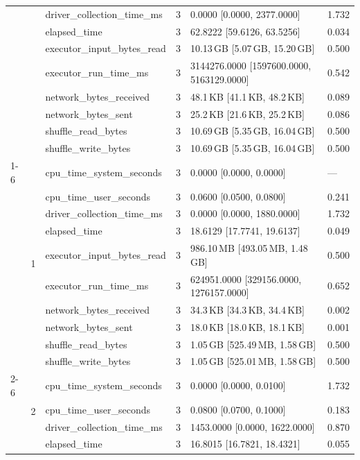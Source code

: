 \begin{tabular}{lllrll}
 &  & driver_collection_time_ms & 3 & 0.0000 [0.0000, 2377.0000] & 1.732 \\
 &  & elapsed_time & 3 & 62.8222 [59.6126, 63.5256] & 0.034 \\
 &  & executor_input_bytes_read & 3 & 10.13\,GB [5.07\,GB, 15.20\,GB] & 0.500 \\
 &  & executor_run_time_ms & 3 & 3144276.0000 [1597600.0000, 5163129.0000] & 0.542 \\
 &  & network_bytes_received & 3 & 48.1\,KB [41.1\,KB, 48.2\,KB] & 0.089 \\
 &  & network_bytes_sent & 3 & 25.2\,KB [21.6\,KB, 25.2\,KB] & 0.086 \\
 &  & shuffle_read_bytes & 3 & 10.69\,GB [5.35\,GB, 16.04\,GB] & 0.500 \\
 &  & shuffle_write_bytes & 3 & 10.69\,GB [5.35\,GB, 16.04\,GB] & 0.500 \\
\cline{1-6} \cline{2-6}
\multirow[t]{30}{*}{national-scale-spatial-join-databricks-broadcast-8-nodes-small} & \multirow[t]{10}{*}{1} & cpu_time_system_seconds & 3 & 0.0000 [0.0000, 0.0000] & --- \\
 &  & cpu_time_user_seconds & 3 & 0.0600 [0.0500, 0.0800] & 0.241 \\
 &  & driver_collection_time_ms & 3 & 0.0000 [0.0000, 1880.0000] & 1.732 \\
 &  & elapsed_time & 3 & 18.6129 [17.7741, 19.6137] & 0.049 \\
 &  & executor_input_bytes_read & 3 & 986.10\,MB [493.05\,MB, 1.48\,GB] & 0.500 \\
 &  & executor_run_time_ms & 3 & 624951.0000 [329156.0000, 1276157.0000] & 0.652 \\
 &  & network_bytes_received & 3 & 34.3\,KB [34.3\,KB, 34.4\,KB] & 0.002 \\
 &  & network_bytes_sent & 3 & 18.0\,KB [18.0\,KB, 18.1\,KB] & 0.001 \\
 &  & shuffle_read_bytes & 3 & 1.05\,GB [525.49\,MB, 1.58\,GB] & 0.500 \\
 &  & shuffle_write_bytes & 3 & 1.05\,GB [525.01\,MB, 1.58\,GB] & 0.500 \\
\cline{2-6}
 & \multirow[t]{10}{*}{2} & cpu_time_system_seconds & 3 & 0.0000 [0.0000, 0.0100] & 1.732 \\
 &  & cpu_time_user_seconds & 3 & 0.0800 [0.0700, 0.1000] & 0.183 \\
 &  & driver_collection_time_ms & 3 & 1453.0000 [0.0000, 1622.0000] & 0.870 \\
 &  & elapsed_time & 3 & 16.8015 [16.7821, 18.4321] & 0.055 \\

\end{tabular}
